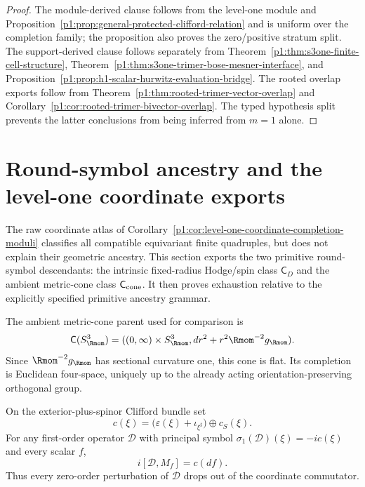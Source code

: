\documentclass[11pt]{article}
\begin{document}
\begin{proof}
The module-derived clause follows from the level-one module and
Proposition~\ref{p1:prop:general-protected-clifford-relation} and is uniform
over the completion family; the proposition also proves the zero/positive
stratum split.  The
support-derived clause follows separately from
Theorem~\ref{p1:thm:s3one-finite-cell-structure},
Theorem~\ref{p1:thm:s3one-trimer-bose-mesner-interface}, and
Proposition~\ref{p1:prop:h1-scalar-hurwitz-evaluation-bridge}.
The rooted overlap exports follow from
Theorem~\ref{p1:thm:rooted-trimer-vector-overlap} and
Corollary~\ref{p1:cor:rooted-trimer-bivector-overlap}. The typed
hypothesis split prevents the latter conclusions from being inferred from
\(m=1\) alone.
\end{proof}


\section{Round-symbol ancestry and the level-one coordinate exports}
\label{p1:sec:round-symbol-ancestry}
\label{p1:sec:metric-cone-clifford-ancestry}

The raw coordinate atlas of
Corollary~\ref{p1:cor:level-one-coordinate-completion-moduli} classifies all
compatible equivariant finite quadruples, but does not explain their geometric
ancestry.  This section exports the two primitive round-symbol descendants:
the intrinsic fixed-radius Hodge/spin class \(\mathsf C_D\) and the ambient
metric-cone class \(\mathsf C_{\rm cone}\).  It then proves exhaustion relative
to the explicitly specified primitive ancestry grammar.

The ambient metric-cone parent used for comparison is
\[
 \mathsf C(S^3_{\Rmom})=((0,\infty)\times S^3_{\Rmom},
 dr^2+r^2\Rmom^{-2}g_{\Rmom}).
\]
Since $\Rmom^{-2}g_{\Rmom}$ has sectional curvature one, this cone is flat.  Its
completion is Euclidean four-space, uniquely up to the already acting
orientation-preserving orthogonal group.

On the exterior-plus-spinor Clifford bundle set
\[
 c(\xi)=\bigl(\varepsilon(\xi)+\iota_{\xi^\sharp}\bigr)\oplus c_S(\xi).
\]
For any first-order operator $\mathscr D$ with principal symbol
$\sigma_1(\mathscr D)(\xi)=-i c(\xi)$ and every scalar $f$,
\begin{equation}
 \label{p1:eq:principal-symbol-commutator}
 i[\mathscr D,M_f]=c(df).
\end{equation}
Thus every zero-order perturbation of $\mathscr D$ drops out of the coordinate
commutator.
\end{document}
